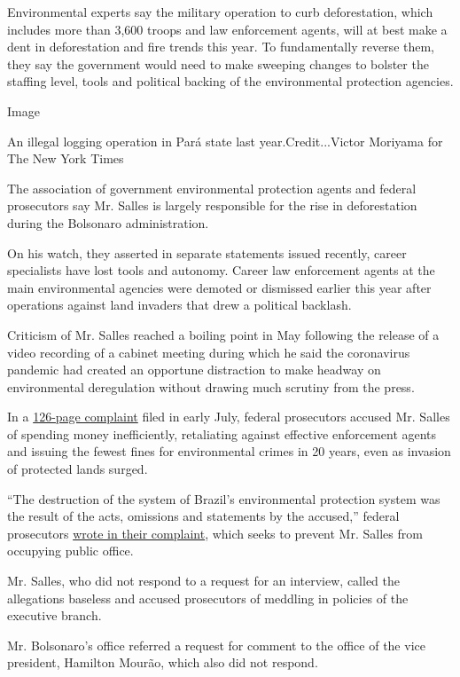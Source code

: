 Environmental experts say the military operation to curb deforestation,
which includes more than 3,600 troops and law enforcement agents, will
at best make a dent in deforestation and fire trends this year. To
fundamentally reverse them, they say the government would need to make
sweeping changes to bolster the staffing level, tools and political
backing of the environmental protection agencies.

Image

An illegal logging operation in Pará state last year.Credit...Victor
Moriyama for The New York Times

The association of government environmental protection agents and
federal prosecutors say Mr. Salles is largely responsible for the rise
in deforestation during the Bolsonaro administration.

On his watch, they asserted in separate statements issued recently,
career specialists have lost tools and autonomy. Career law enforcement
agents at the main environmental agencies were demoted or dismissed
earlier this year after operations against land invaders that drew a
political backlash.

Criticism of Mr. Salles reached a boiling point in May following the
release of a video recording of a cabinet meeting during which he said
the coronavirus pandemic had created an opportune distraction to make
headway on environmental deregulation without drawing much scrutiny from
the press.

In a
\href{http://www.mpf.mp.br/df/sala-de-imprensa/docs/aia-salles-1}{126-page
complaint} filed in early July, federal prosecutors accused Mr. Salles
of spending money inefficiently, retaliating against effective
enforcement agents and issuing the fewest fines for environmental crimes
in 20 years, even as invasion of protected lands surged.

``The destruction of the system of Brazil's environmental protection
system was the result of the acts, omissions and statements by the
accused,'' federal prosecutors
\href{http://www.mpf.mp.br/df/sala-de-imprensa/noticias-df/mpf-pede-afastamento-de-ricardo-salles-do-ministerio-do-meio-ambiente-por-improbidade-administrativa}{wrote
in their complaint}, which seeks to prevent Mr. Salles from occupying
public office.

Mr. Salles, who did not respond to a request for an interview, called
the allegations baseless and accused prosecutors of meddling in policies
of the executive branch.

Mr. Bolsonaro's office referred a request for comment to the office of
the vice president, Hamilton Mourão, which also did not respond.

